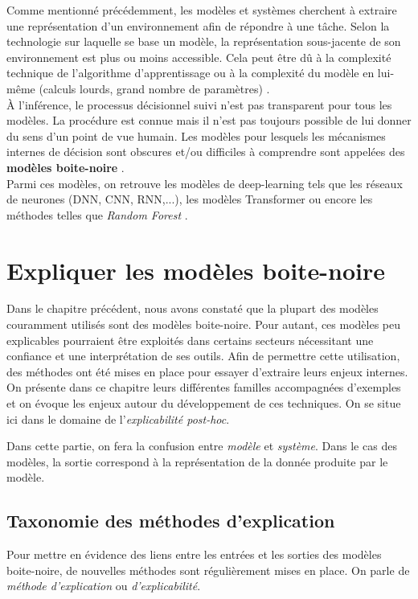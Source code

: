 \documentclass{report}
\begin{document}
    Comme mentionné précédemment, les modèles et systèmes cherchent à extraire une représenta\-tion d'un environnement afin de répondre à une tâche. Selon la technologie sur laquelle se base un modèle, la représentation sous-jacente de son environnement est plus ou moins accessible. Cela peut être dû à la complexité technique de l'algorithme d'apprentissage ou à la complexité du modèle en lui-même (calculs lourds, grand nombre de paramètres) \cite{garouani_investigating_2024}. \\
    À l'inférence, le processus décisionnel suivi n'est pas transparent pour tous les modèles. La procédure est connue mais il n'est pas toujours possible de lui donner du sens d'un point de vue humain. Les modèles pour lesquels les mécanismes internes de décision sont obscures et/ou difficiles à comprendre sont appelées des \textbf{modèles boite-noire} \cite{bell_its_2022, garouani_investigating_2024}.\\
    Parmi ces modèles, on retrouve les modèles de deep-learning tels que les réseaux de neurones (DNN, CNN, RNN,...), les modèles Transformer ou encore les méthodes telles que \emph{Random Forest} \cite{garouani_investigating_2024}.



\chapter{Expliquer les modèles boite-noire}
    Dans le chapitre précédent, nous avons constaté que la plupart des modèles couramment utilisés sont des modèles boite-noire. Pour autant, ces modèles peu explicables pourraient être exploités dans certains secteurs nécessitant une confiance et une interprétation de ses outils. Afin de permettre cette utilisation, des méthodes ont été mises en place pour essayer d'extraire leurs enjeux internes. On présente dans ce chapitre leurs différentes familles accompagnées d'exemples et on évoque les enjeux autour du développement de ces techniques. On se situe ici dans le domaine de l'\emph{explicabilité post-hoc}.
    
    Dans cette partie, on fera la confusion entre \emph{modèle} et \emph{système}. Dans le cas des modèles, la sortie correspond à la représentation de la donnée produite par le modèle.
    
\section{Taxonomie des méthodes d'explication}
    Pour mettre en évidence des liens entre les entrées et les sorties des modèles boite-noire, de nouvelles méthodes sont régulièrement mises en place. On parle de \emph{méthode d'explication} ou \emph{d'explicabilité}.
    
\end{document}
